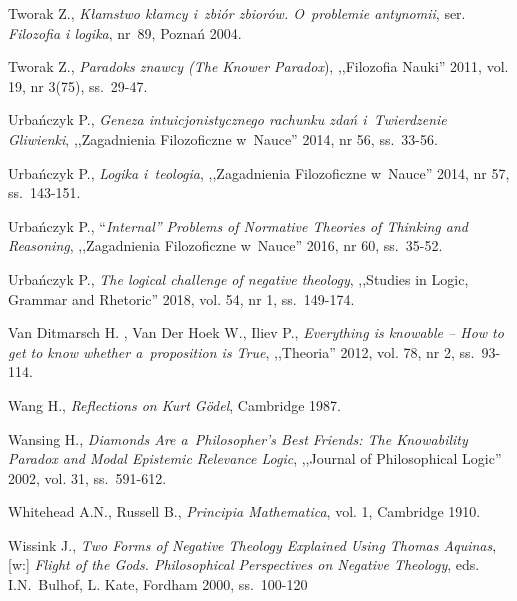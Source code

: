 \begin{thebibliography}{100}
Tworak Z., \textit{Kłamstwo kłamcy i~zbiór zbiorów. O~problemie antynomii}, ser. \textit{Filozofia i logika}, nr~89, Poznań 2004.

Tworak Z., \textit{Paradoks znawcy (The Knower Paradox}), ,,Filozofia Nauki'' 2011, vol. 19, nr 3(75), ss.~29-47.


Urbańczyk P., \textit{Geneza intuicjonistycznego rachunku zdań i~Twierdzenie Gliwienki}, ,,Zagadnienia Filozoficzne w~Nauce'' 2014, nr 56, ss.~33-56.

Urbańczyk P., \textit{Logika i~teologia}, ,,Zagadnienia Filozoficzne w~Nauce'' 2014, nr 57, ss.~143-151.

Urbańczyk P., ``\textit{Internal'' Problems of Normative Theories of Thinking and Reasoning}, ,,Zagadnienia Filozoficzne w~Nauce'' 2016, nr 60, ss.~35-52.

Urbańczyk P., \textit{The logical challenge of negative theology}, ,,Studies in Logic, Grammar and Rhetoric'' 2018, vol. 54, nr 1, ss.~149-174.


Van Ditmarsch H. , Van Der Hoek W., Iliev P., \textit{Everything is knowable -- How to get to know whether a~proposition is True}, ,,Theoria'' 2012, vol. 78, nr 2, ss.~93-114.

Wang H., \textit{Reflections on Kurt Gödel}, Cambridge 1987.



Wansing H., \textit{Diamonds Are a~Philosopher's Best Friends: The Knowability Paradox and Modal Epistemic Relevance Logic}, ,,Journal of Philosophical Logic'' 2002, vol. 31, ss.~591-612.

Whitehead A.N., Russell B., \textit{Principia Mathematica}, vol. 1, Cambridge 1910.

Wissink J., \textit{Two Forms of Negative Theology Explained Using Thomas Aquinas}, [w:]
 \textit{Flight of the Gods. Philosophical Perspectives on Negative Theology}, eds. I.N.~Bulhof, L. Kate, Fordham 2000, ss.~100-120


\end{thebibliography}

